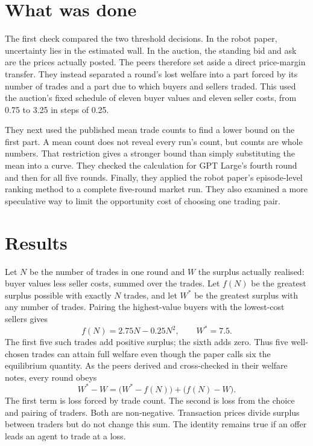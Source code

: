 \documentclass{article}
\begin{document}
\section{What was done}

The first check compared the two threshold decisions. In the robot paper, uncertainty lies in the estimated
wall. In the auction, the standing bid and ask are the prices actually posted. The peers therefore set aside a
direct price-margin transfer. They instead separated a round's lost welfare into a part forced by its number
of trades and a part due to which buyers and sellers traded. This used the auction's fixed schedule of eleven
buyer values and eleven seller costs, from 0.75 to 3.25 in steps of 0.25.

They next used the published mean trade counts to find a lower bound on the first part. A mean count does not
reveal every run's count, but counts are whole numbers. That restriction gives a stronger bound than simply
substituting the mean into a curve. They checked the calculation for GPT Large's fourth round and then for all
five rounds. Finally, they applied the robot paper's episode-level ranking method to a complete five-round
market run. They also examined a more speculative way to limit the opportunity cost of choosing one trading
pair.

\section{Results}

Let \(N\) be the number of trades in one round and \(W\) the surplus actually realised: buyer values less
seller costs, summed over the trades. Let \(f(N)\) be the greatest surplus possible with exactly \(N\) trades,
and let \(W^*\) be the greatest surplus with any number of trades. Pairing the highest-value buyers with the
lowest-cost sellers gives
\[
f(N)=2.75N-0.25N^2,\qquad W^*=7.5.
\]
The first five such trades add positive surplus; the sixth adds zero. Thus five well-chosen trades can attain
full welfare even though the paper calls six the equilibrium quantity. As the peers derived and cross-checked
in their welfare notes, every round obeys
\[
W^*-W=\bigl(W^*-f(N)\bigr)+\bigl(f(N)-W\bigr).
\]
The first term is loss forced by trade count. The second is loss from the choice and pairing of traders. Both
are non-negative. Transaction prices divide surplus between traders but do not change this sum. The identity
remains true if an offer leads an agent to trade at a loss.
\end{document}
